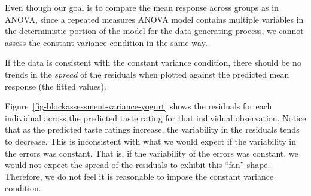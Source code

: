 \documentclass[
  letterpaper,
  DIV=11,
  numbers=noendperiod]{scrreprt}
\theoremstyle{definition}
\theoremstyle{definition}
\theoremstyle{plain}
\theoremstyle{remark}
\begin{document}
\begin{tcolorbox}[enhanced jigsaw, colbacktitle=quarto-callout-warning-color!10!white, colback=white, left=2mm, title=\textcolor{quarto-callout-warning-color}{\faExclamationTriangle}\hspace{0.5em}{Warning}, toptitle=1mm, leftrule=.75mm, breakable, bottomrule=.15mm, arc=.35mm, rightrule=.15mm, toprule=.15mm, coltitle=black, opacityback=0, colframe=quarto-callout-warning-color-frame, opacitybacktitle=0.6, bottomtitle=1mm, titlerule=0mm]

Even though our goal is to compare the mean response across groups as in
ANOVA, since a repeated measures ANOVA model contains multiple variables
in the deterministic portion of the model for the data generating
process, we cannot assess the constant variance condition in the same
way.

\end{tcolorbox}

\begin{tcolorbox}[enhanced jigsaw, colbacktitle=quarto-callout-note-color!10!white, colback=white, left=2mm, title=\textcolor{quarto-callout-note-color}{\faInfo}\hspace{0.5em}{Graphically Assessing the Constant Variance Condition}, toptitle=1mm, leftrule=.75mm, breakable, bottomrule=.15mm, arc=.35mm, rightrule=.15mm, toprule=.15mm, coltitle=black, opacityback=0, colframe=quarto-callout-note-color-frame, opacitybacktitle=0.6, bottomtitle=1mm, titlerule=0mm]

If the data is consistent with the constant variance condition, there
should be no trends in the \emph{spread} of the residuals when plotted
against the predicted mean response (the fitted values).

\end{tcolorbox}

Figure~\ref{fig-blockassessment-variance-yogurt} shows the residuals for
each individual across the predicted taste rating for that individual
observation. Notice that as the predicted taste ratings increase, the
variability in the residuals tends to decrease. This is inconsistent
with what we would expect if the variability in the errors was constant.
That is, if the variability of the errors was constant, we would not
expect the spread of the residuals to exhibit this ``fan'' shape.
Therefore, we do not feel it is reasonable to impose the constant
variance condition.
\end{document}
